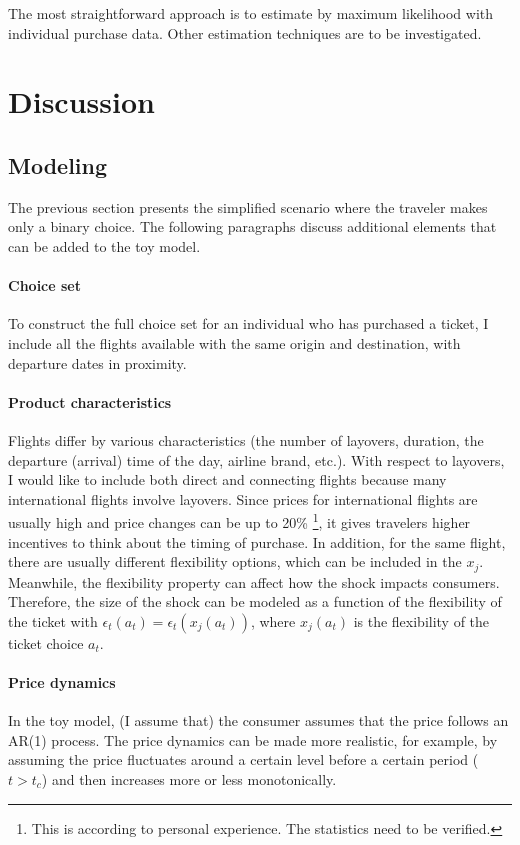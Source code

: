 \documentclass[12pt]{article}
\begin{document}
The most straightforward approach is to estimate by maximum likelihood with
individual purchase data. Other estimation techniques are to be investigated.

\section{Discussion}

\subsection{Modeling} The previous section presents the simplified scenario where the traveler makes
only a binary choice. The following paragraphs discuss additional elements that
can be added to the toy model.
\paragraph{Choice set} To construct the full choice set for an individual who has purchased a ticket,
I include all the flights available with the same origin and destination, with
departure dates in proximity.

\paragraph{Product characteristics} Flights differ by various characteristics (the number of layovers, duration,
the departure (arrival) time of the day, airline brand, etc.). With respect to
layovers, I would like to include both direct and connecting flights because
many international flights involve layovers. Since prices for international
flights are usually high and price changes can be up to 20\% \footnote{This is
    according to personal experience. The statistics need to be verified.}, it
gives travelers higher incentives to think about the timing of purchase. In
addition, for the same flight, there are usually different flexibility options,
which can be included in the $x_j$. Meanwhile, the flexibility property can
affect how the shock impacts consumers. Therefore, the size of the shock can be
modeled as a function of the flexibility of the ticket with
$\epsilon_t(a_t)=\epsilon_t(x_j(a_t))$, where $x_j(a_t)$ is the flexibility of
the ticket choice $a_t$.

\paragraph{Price dynamics} In the toy model, (I assume that) the consumer assumes that the price follows
an AR(1) process. The price dynamics can be made more realistic, for example,
by assuming the price fluctuates around a certain level before a certain period
($t>t_c$) and then increases more or less monotonically.
\end{document}
